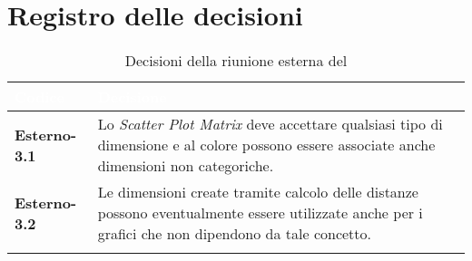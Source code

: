 \section{Registro delle decisioni}
{
\renewcommand{\arraystretch}{1.5}
\centering
\begin{longtable}{C{3cm} C{9cm}}
\textcolor{white}{\textbf{Codice}}&
\textcolor{white}{\textbf{Decisione}}\\	
\endhead
		
\textbf{Esterno-3.1} & Lo \textit{Scatter Plot Matrix} deve accettare qualsiasi tipo di dimensione e al colore possono essere associate anche dimensioni non categoriche.\\

\textbf{Esterno-3.2} & Le dimensioni create tramite calcolo delle distanze possono eventualmente essere utilizzate anche per i grafici che non dipendono da tale concetto.\\

\caption{Decisioni della riunione esterna del \Data{}}
		
\end{longtable}
}

